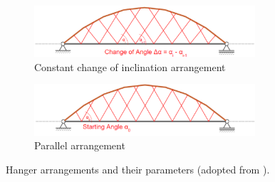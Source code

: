 \begin{figure}[H]
\centering
\begin{subfigure}{0.5\textwidth}
    \centering
    \includegraphics[width=0.9\textwidth]{Pictures/ConstantChangeCavegn.PNG}
    \caption{Constant change of inclination arrangement}
    \label{fig:Cavegn1}
\end{subfigure}%
\begin{subfigure}{.5\textwidth}
    \centering
    \includegraphics[width=0.9\textwidth]{Pictures/ParallelArrangementCavegn.PNG}
    \caption{Parallel arrangement}
    \label{fig:Cavegn2}
\end{subfigure}
\caption{Hanger arrangements and their parameters (adopted from \cite{Cavegn}).}
\label{fig:Cavegn}
\end{figure}

